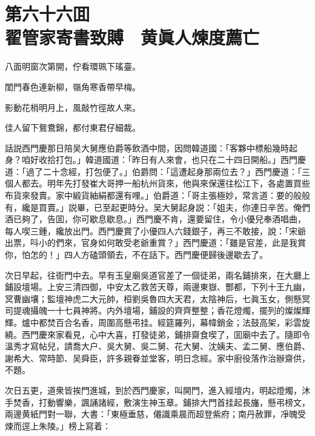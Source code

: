 
\chapter*{第六十六囬　\\翟管家寄書致賻　黄眞人煉度薦亡}


\begin{myquote}
八面明窗次第開，佇看環珮下瑤臺。

閨門春色連新柳，嶺角寒香帶早梅。

影動花梢明月上，風敲竹徑故人來。

佳人留下鴛鴦錦，都付東君仔細裁。
\end{myquote}

話説西門慶那日陪吴大舅應伯爵等飲酒中間，因問韓道國：「客夥中標船幾時起身？咱好收拾打包。」韓道國道：「昨日有人來會，也只在二十四日開船。」西門慶道：「過了二十念經，打包便了。」伯爵問：「這遭起身那兩位去？」西門慶道：「三個人都去。明年先打發崔大哥押一船杭州貨來，他與來保還往松江下，各處置買些布貨來發賣。家中緞貨紬絹都還有哩。」伯爵道：「哥主張極妙，常言道：要的般般有，纔是買賣。」説畢，已至起更時分。吴大舅起身説：「姐夫，你連日辛苦。俺們酒已夠了，告囬，你可歇息歇息。」西門慶不肯，還要留住，令小優兒奉酒唱曲，每人喫三鍾，纔放出門。西門慶賞了小優四人六錢銀子，再三不敢接，說：「宋爺出票，呌小的們來，官身如何敢受老爺重賞？」西門慶道：「雖是官差，此是我賞你，怕怎的！」四人方磕頭領去，不在話下。西門慶便歸後邊歇去了。

次日早起，往衙門中去。早有玉皇廟吳道官差了一個徒弟，兩名鋪排來，在大廳上鋪設壇場。上安三清四御，中安太乙救苦天尊，兩邊東嶽、酆都，下列十王九幽，冥曹幽壤；監壇神虎二大元帥，桓劉吳魯四大天君，太陰神后，七眞玉女，側懸冥司提魂攝魄一十七員神將。内外壇場，鋪設的齊齊整整；香花燈燭，擺列的燦燦輝輝。爐中都焚百合名香，周圍高懸弔挂。經筵羅列，幕幃銷金；法鼓高架，彩雲旋繞。西門慶來家看見，心中大喜，打發徒弟，鋪排齋食喫了，囬廟中去了。隨即令溫秀才寫帖兒，請喬大户、吳大舅、吳二舅、花大舅、沈姨夫、孟二舅、應伯爵、謝希大、常時節、吴舜臣，許多親眷並堂客，明日念經。家中廚役落作治辦齋供，不題。

次日五更，道衆皆挨門進城，到於西門慶家，叫開門，進入經壇内，明起燈燭，沐手焚香，打動響樂，諷誦諸經，敷演生神玉章。鋪排大門首挂起長旛，懸弔榜文，兩邊黄紙門對一聯，大書：「東極垂慈，僊識乘晨而超登紫府；南丹赦罪，凈魄受煉而逕上朱陵。」榜上寫着：

